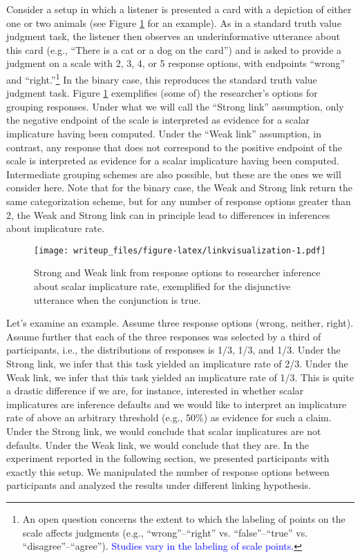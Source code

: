 \documentclass[man]{apa6}
\newcommand{\change}[1]{\textcolor{Blue}{#1}}
\theoremstyle{definition}
\theoremstyle{definition}
\theoremstyle{definition}
\theoremstyle{remark}
\begin{document}
Consider a setup in which a listener is presented a card with a
depiction of either one or two animals (see Figure
\ref{fig:linkvisualization} for an example). As in a standard truth
value judgment task, the listener then observes an underinformative
utterance about this card (e.g., \enquote{There is a cat or a dog on the
card}) and is asked to provide a judgment on a scale with 2, 3, 4, or 5
response options, with endpoints \enquote{wrong} and
\enquote{right.}\footnote{An open question concerns the extent to which
  the labeling of points on the scale affects judgments (e.g.,
  \enquote{wrong}--\enquote{right} vs. \enquote{false}--\enquote{true}
  vs. \enquote{disagree}--\enquote{agree}). \change{Studies vary in the labeling of scale points.}} In the binary case, this reproduces the standard
truth value judgment task. Figure \ref{fig:linkvisualization}
exemplifies (some of) the researcher's options for grouping responses.
Under what we will call the \enquote{Strong link} assumption, only the
negative endpoint of the scale is interpreted as evidence for a scalar
implicature having been computed. Under the \enquote{Weak link}
assumption, in contrast, any response that does not correspond to the
positive endpoint of the scale is interpreted as evidence for a scalar
implicature having been computed. Intermediate grouping schemes are also
possible, but these are the ones we will consider here. Note that for
the binary case, the Weak and Strong link return the same categorization
scheme, but for any number of response options greater than 2, the Weak
and Strong link can in principle lead to differences in inferences about
implicature rate.

\begin{figure}
\centering
\texttt{[image: writeup\_files/figure-latex/linkvisualization-1.pdf]}
\caption{\label{fig:linkvisualization}Strong and Weak link from response
options to researcher inference about scalar implicature rate,
exemplified for the disjunctive utterance when the conjunction is true.}
\end{figure}

Let's examine an example. Assume three response options (wrong, neither,
right). Assume further that each of the three responses was selected by
a third of participants, i.e., the distributions of responses is 1/3,
1/3, and 1/3. Under the Strong link, we infer that this task yielded an
implicature rate of 2/3. Under the Weak link, we infer that this task
yielded an implicature rate of 1/3. This is quite a drastic difference
if we are, for instance, interested in whether scalar implicatures are
inference defaults and we would like to interpret an implicature rate of
above an arbitrary threshold (e.g., 50\%) as evidence for such a claim.
Under the Strong link, we would conclude that scalar implicatures are
not defaults. Under the Weak link, we would conclude that they are. In
the experiment reported in the following section, we presented
participants with exactly this setup. We manipulated the number of
response options between participants and analyzed the results under
different linking hypothesis.
\end{document}
